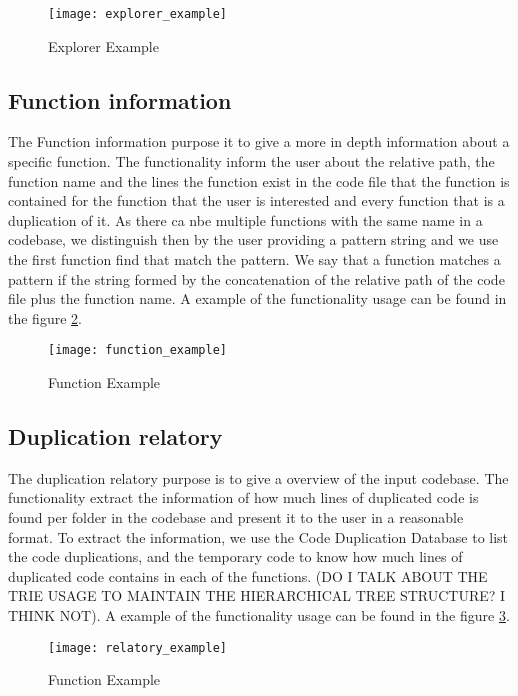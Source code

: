 \begin{figure}
\texttt{[image: explorer\_example]}
\caption{Explorer Example}
\label{fig:explorer_ex}
\end{figure}


\subsection{Function information}

The Function information purpose it to give a more in depth information about a specific function. The functionality inform the user
about the relative path, the function name and the lines the function exist in the code file that the function is contained for the
function that the user is interested and every function that is a duplication of it. As there ca nbe multiple functions with the 
same name in a codebase, we distinguish then by the user providing a pattern string and we use the first function find that match
the pattern. We say that a function matches a pattern if the string formed by the concatenation of the relative path of the 
code file plus the function name. 
A example of the functionality usage can be found in the figure \ref{fig:function_ex}.


\begin{figure}
\texttt{[image: function\_example]}
\caption{Function Example}
\label{fig:function_ex}
\end{figure}


\subsection{Duplication relatory}

The duplication relatory purpose is to give a overview of the input codebase. The functionality extract the information
of how much lines of duplicated code is found per folder in the codebase and present it to the user in a reasonable format. To extract
the information, we use the Code Duplication Database to list the code duplications, and the temporary code to know how much lines of
duplicated code contains in each of the functions. (DO I TALK ABOUT THE TRIE USAGE TO MAINTAIN THE HIERARCHICAL TREE STRUCTURE? I 
THINK NOT). A example of the functionality usage can be found in the figure \ref{fig:relatory_ex}.

\begin{figure}
\texttt{[image: relatory\_example]}
\caption{Function Example}
\label{fig:relatory_ex}
\end{figure}





